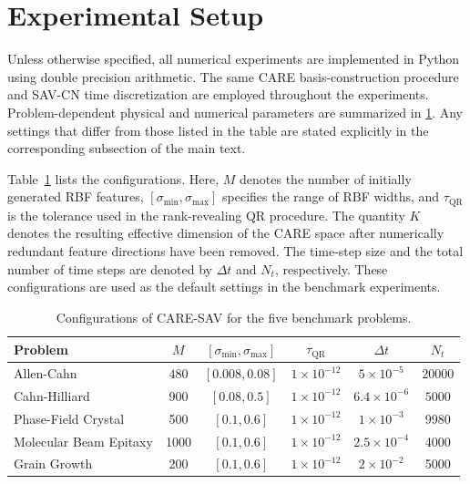 \documentclass[10pt,reqno]{amsart}
\theoremstyle{remark}
\theoremstyle{definition}
\begin{document}
\section{Experimental Setup}
\label{sec:SM-experimental-setup}

Unless otherwise specified, all numerical experiments are implemented in Python using double precision arithmetic. The same CARE basis-construction procedure and SAV-CN time discretization are employed throughout the experiments. Problem-dependent physical and numerical parameters are summarized in \cref{tab:baseline_parameters}. Any settings that differ from those listed in the table are stated explicitly in the corresponding subsection of the main text.

Table~\ref{tab:baseline_parameters} lists the configurations. Here, $M$ denotes the number of initially generated RBF features, $[\sigma_{\min},\sigma_{\max}]$ specifies the range of RBF widths, and $\tau_{\mathrm{QR}}$ is the tolerance used in the rank-revealing QR procedure. The quantity $K$ denotes the resulting effective dimension of the CARE space after numerically redundant feature directions have been removed. The time-step size and the total number of time steps are denoted by $\Delta t$ and $N_t$, respectively. These configurations are used as the default settings in the benchmark experiments.

\begin{table}[htbp]
\centering
\caption{Configurations of CARE-SAV for the five benchmark problems.}
\label{tab:baseline_parameters}
\small
\setlength{\tabcolsep}{5pt}
\renewcommand{\arraystretch}{1.15}
\begin{tabular}{lccccc}
\hline
Problem
& $M$
& $[\sigma_{\min},\sigma_{\max}]$
& $\tau_{\mathrm{QR}}$
& $\Delta t$
& $N_t$
\\
\hline
Allen-Cahn
& $480$
& $[0.008,0.08]$
& $1\times10^{-12}$
& $5\times10^{-5}$
& $20000$
\\
Cahn-Hilliard
& 900
& $[0.08,0.5]$
& $1\times10^{-12}$
& $6.4\times10^{-6}$
& $5000$
\\
Phase-Field Crystal
& 500
& $[0.1,0.6]$
& $1\times10^{-12}$
& $1\times10^{-3}$
& 9980
\\
Molecular Beam Epitaxy
& 1000
& $[0.1,0.6]$
& $1\times10^{-12}$
& $2.5\times10^{-4}$
& 4000
\\
Grain Growth
& 200
& $[0.1,0.6]$
& $1\times10^{-12}$
& $2\times10^{-2}$
& 5000
\\
\hline
\end{tabular}
\end{table}
\end{document}
